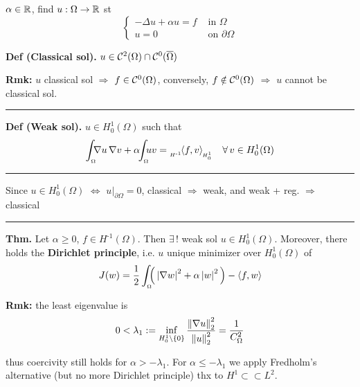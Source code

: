 
$\alpha\in\mathbb{R}$, find $u:\Omega\to\mathbb{R}$ st
\begin{equation*}
\begin{cases}
    -\Delta u +\alpha u = f &\text{ in }\Omega\\
    u=0 &\text{ on }\partial\Omega    
\end{cases}
\end{equation*}

\textbf{Def (Classical sol).} $u\in\mathcal{C}^2(\Omega)\cap\mathcal{C}^0(\overline{\Omega})$

\smallskip

\textbf{Rmk:} $u$ classical sol $\Rightarrow$ $f\in\mathcal{C}^0(\Omega)$, conversely, $f\notin\mathcal{C}^0(\Omega)$ $\Rightarrow$ $u$ cannot be classical sol.

\rule{0.31\textwidth}{0.2pt}
\smallskip

\textbf{Def (Weak sol).} $u\in H^1_0(\Omega)$ such that
\begin{equation*}
\int_{_\Omega}\!\!\!  \nabla u\,\nabla v +\alpha\!\!\int_{_\Omega}\!\!\!  uv ={}_{_{H^{\text{-}1}}}\!\!\sca{f,v}{}_{_{\!\!H^1_0}}\quad\forall\, v\in H^1_0(\Omega)
\end{equation*}

\rule{0.31\textwidth}{0.2pt}
\smallskip

Since $u\in H^1_0(\Omega)$ $\Leftrightarrow$ $u\big|_{\partial \Omega}=0$, classical $\Rightarrow$ weak, and weak + reg. $\Rightarrow$ classical

\rule{0.31\textwidth}{0.2pt}
\smallskip

\textbf{Thm.} Let $\alpha\geq 0$, $f\in H^{\text{-}1}(\Omega)$. Then $\exists\,!$ weak sol $u\in H^1_0(\Omega)$. Moreover, there holds the \textbf{Dirichlet principle}, i.e. $u$ unique minimizer over $H^1_0(\Omega)$ of 
\begin{equation*}
J(w)=\frac{1}{2}\int_{_\Omega}\!\!\!  \Big( \left| \nabla w \right|^2+\alpha\left| w \right|^2 \Big)-\left\langle f,w \right\rangle
\end{equation*}

\textbf{Rmk:} the least eigenvalue is 
\begin{equation*}
0<\lambda_1:=\inf_{H^1_0\setminus\{0\}} \frac{\left\lVert \nabla u \right\rVert_2^2}{\left\lVert u \right\rVert_2^2}=\frac{1}{C_\Omega^2}  
\end{equation*}

thus coercivity still holds for $\alpha>-\lambda_1$. For $\alpha\leq -\lambda_1$ we apply Fredholm's alternative (but no more Dirichlet principle) thx to $H^1\subset\subset L^2$.


